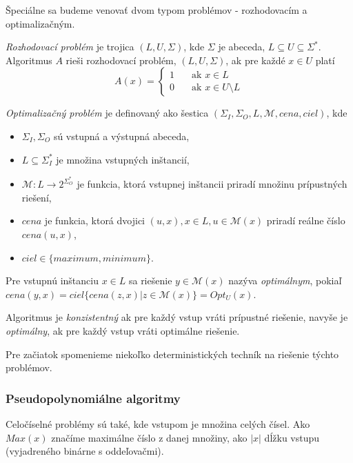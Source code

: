 Špeciálne sa budeme venovať dvom typom problémov - rozhodovacím
a optimalizačným.

\begin{definition}
	{\em Rozhodovací problém} je trojica $(L, U, \Sigma)$, kde 
	$\Sigma$ je abeceda, $L \subseteq U \subseteq \Sigma^*$.
	Algoritmus $A$ rieši rozhodovací problém, $(L, U, \Sigma)$,
	ak pre každé $x \in U$ platí
	\[
		A(x) = 
		\begin{cases}
			1 &\quad\text{ak } x \in L\\
			0 &\quad\text{ak } x \in U \setminus L
		\end{cases}
	\]
\end{definition}

\begin{definition}
	{\em Optimalizačný problém} je definovaný ako šestica 
	$(\Sigma_I, \Sigma_O, L, \mathcal{M}, cena, ciel)$, kde 
	\begin{itemize}
		\item $\Sigma_I, \Sigma_O$ sú vstupná a výstupná abeceda,
		\item $L \subseteq \Sigma_I^*$ je množina vstupných inštancií,
		\item $\mathcal{M}: L \to 2^{\Sigma_O^*}$ je funkcia, ktorá vstupnej
		inštancii priradí množinu prípustných riešení,
		\item $cena$ je funkcia, ktorá dvojici $(u,x), x \in L, u \in \mathcal{M}(x)$
		priradí reálne číslo $cena(u,x)$,
		\item $ciel \in \{maximum, minimum\}$.
	\end{itemize}
	
	Pre vstupnú inštanciu $x \in L$ sa riešenie $y \in \mathcal{M}(x)$ nazýva {\em optimálnym},
	pokiaľ $cena(y,x) = ciel\{ cena(z,x) | z \in \mathcal{M}(x) \} = Opt_U(x)$.
	
	Algoritmus je {\em konzistentný} ak pre každý vstup vráti prípustné riešenie,
	navyše je {\em optimálny}, ak pre každý vstup vráti optimálne riešenie.
\end{definition}

Pre začiatok spomenieme niekoľko deterministických techník na riešenie týchto 
problémov.

\subsubsection{Pseudopolynomiálne algoritmy}
Celočíselné problémy sú také, kde vstupom je množina celých čísel. Ako $Max(x)$
značíme maximálne číslo z danej množiny, ako $|x|$ dĺžku vstupu (vyjadreného 
binárne s oddeľovačmi).

